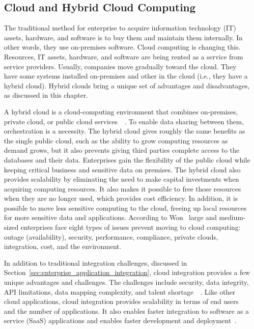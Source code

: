 \documentclass[english, 12pt, a4paper, sci, utf8, a-2b, online, obeyspaces]{aaltothesis}
\begin{document}
\subsection{Cloud and Hybrid Cloud Computing}
The traditional method for enterprise to acquire information technology (IT) assets, hardware, and software is to buy them and maintain them internally. In other words, they use on-premises software. Cloud computing is changing this. Resources, IT assets, hardware, and software are being rented as a service from service providers. Usually, companies move gradually toward the cloud. They have some systems installed on-premises and other in the cloud (i.e., they have a hybrid cloud). Hybrid clouds bring a unique set of advantages and disadvantages, as discussed in this chapter.

A hybrid cloud is a cloud-computing environment that combines on-premises, private cloud, or public cloud services~\cite{microsoft2018cloud}~\cite{microsoft2018what}. To enable data sharing between them, orchestration is a necessity. The hybrid cloud gives roughly the same benefits as the single public cloud, such as the ability to grow computing resources as demand grows, but it also prevents giving third parties complete access to the databases and their data. Enterprises gain the flexibility of the public cloud while keeping critical business and sensitive data on premises. The hybrid cloud also provides scalability by eliminating the need to make capital investments when acquiring computing resources. It also makes it possible to free those resources when they are no longer used, which provides cost efficiency. In addition, it is possible to move less sensitive computing to the cloud, freeing up local resources for more sensitive data and applications. According to Won~\cite{kim2009adoption,} large and medium-sized enterprises face eight types of issues prevent moving to cloud computing: outage (availability), security, performance, compliance, private clouds, integration, cost, and the environment.

In addition to traditional integration challenges, discussed in Section~\ref{sec:enterprise_application_integration}, cloud integration provides a few unique advantages and challenges. The challenges include security, data integrity, API limitations, data mapping complexity, and talent shortage~\cite{mulesoft2018understanding}~\cite{hildebrand2018top}. Like other cloud applications, cloud integration provides scalability in terms of end users and the number of applications. It also enables faster integration to software as a service (SaaS) applications and enables faster development and deployment~\cite{mungrah2017cloud}.
\end{document}
